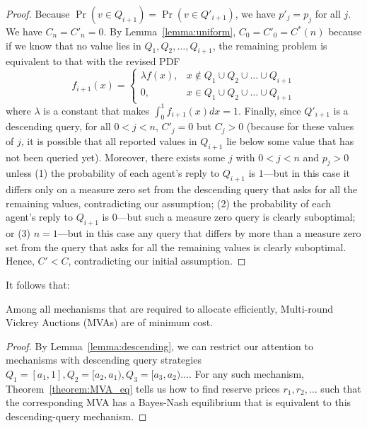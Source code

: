 \begin{proof}
Because $\Pr(v \in Q_{i+1}) = \Pr(v \in Q'_{i+1})$, we have $p'_j = p_j$
for all $j$.  We have $C_n = C'_n = 0$.
By Lemma~\ref{lemma:uniform},
$C_0 = C'_0 = C^*(n)$ 
because if we know that no value lies in $Q_1, Q_2, \ldots, Q_{i+1}$, the
remaining problem  is equivalent to that with the revised PDF
\[
f_{i+1}(x) = \begin{cases}
	\lambda f(x), & x \notin Q_1 \cup Q_2 \cup \ldots \cup Q_{i+1} \\
	0, & x \in Q_1 \cup Q_2 \cup \ldots \cup Q_{i+1}
\end{cases}
\]
where $\lambda$ is a constant that makes $\int_0^1 f_{i+1}(x) dx = 1$.
Finally, since $Q'_{i+1}$ is a descending query, for all $0 < j < n$,
$C'_j = 0$ but $C_j > 0$ (because for these values of $j$, it is possible
that all reported values in $Q_{i+1}$ lie below some value that has not
been queried yet).  Moreover, there exists some $j$ with $0 < j < n$ and
$p_j > 0$ unless (1) the probability of each agent's reply to $Q_{i+1}$ is
$1$---but in this case it differs only on a measure zero set from the
descending query that asks for all the remaining values, contradicting our
assumption; (2) the probability of each agent's reply to $Q_{i+1}$ is
$0$---but such a measure zero query is clearly suboptimal;
or (3) $n=1$---but in this case any query that differs by more
than a measure zero set from the query that asks for all the remaining
values is clearly suboptimal.
Hence, $C' < C$, contradicting our initial assumption.
\end{proof}

It follows that:


\begin{theorem}\label{theorem:MVA_eq}
Among all mechanisms
that are
required to allocate efficiently,
Multi-round Vickrey Auctions (MVAs) are of minimum cost.
\end{theorem}

\begin{proof}
By Lemma~\ref{lemma:descending}, we can restrict our attention to
mechanisms with  descending query strategies
$Q_1 = [a_1, 1], Q_2 = [a_2, a_1), Q_3 = [a_3, a_2) \ldots$.
For any such mechanism, Theorem~\ref{theorem:MVA_eq} tells us how to find reserve prices $r_1, r_2,
\ldots$ such that the corresponding MVA has a Bayes-Nash equilibrium that
is equivalent to this descending-query mechanism.
\end{proof}

